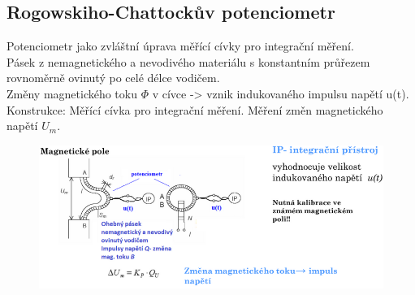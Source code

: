 \subsection{Rogowskiho-Chattockův potenciometr}
Potenciometr jako zvláštní úprava měřící cívky pro integrační měření.\\
Pásek z nemagnetického a nevodivého materiálu s konstantním průřezem rovnoměrně ovinutý po celé délce vodičem.\\
Změny magnetického toku \(\Phi\) v cívce -> vznik indukovaného impulsu napětí u(t).\\
Konstrukce: Měřící cívka pro integrační měření. Měření změn magnetického napětí \(U_m\).\\
\begin{figure}[h!]
    \centering
    \includegraphics[scale = 0.5]{images/RChPoten.png}
\end{figure}

